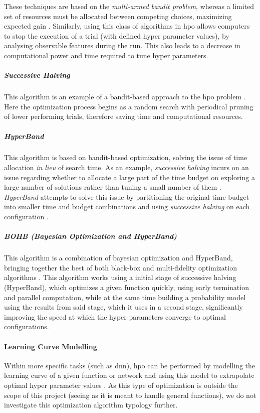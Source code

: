 These techniques are based on the \textit{multi-armed bandit problem}, whereas a limited set of resources must be allocated between competing choices, maximizing expected gain \parencite{Katehakis1987TheMB}. Similarly, using this class of algorithms in \acrshort{hpo} allows computers to stop the execution of a trial (with defined hyper parameter values), by analysing observable features during the run. This also leads to a decrease in computational power and time required to tune hyper parameters. 

\subparagraph{Successive Halving} 
This algorithm is an example of a bandit-based approach to the \acrshort{hpo} problem \parencite{jamieson2015nonstochastic}. Here the optimization process begins as a random search with periodical pruning of lower performing trials, therefore saving time and computational resources. 

\subparagraph{HyperBand}
This algorithm is based on bandit-based optimization, solving the issue of time allocation \textit{in lieu} of search time. As an example, \textit{successive halving} incurs on an issue regarding whether to allocate a large part of the time budget on exploring a large number of solutions rather than tuning a small number of them \parencite{elshawi2019automated}. \textit{HyperBand} attempts to solve this issue by partitioning the original time budget into smaller time and budget combinations and using \textit{successive halving} on each configuration \parencite{li2016hyperband}.

\subparagraph{BOHB (Bayesian Optimization and HyperBand)}
This algorithm is a combination of bayesian optimization and HyperBand, bringing together the best of both black-box and multi-fidelity optimization algorithms \parencite{pmlr-v80-falkner18a}. This algorithm works using a initial stage of successive halving (HyperBand), which optimizes a given function quickly, using early termination and parallel computation, while at the same time building a probability model using the results from said stage, which it uses in a second stage, significantly improving the speed at which the hyper parameters converge to optimal configurations.

\paragraph{Learning Curve Modelling}
Within more specific tasks (such as \acrfull{dnn}), \acrshort{hpo} can be performed by modelling the learning curve of a given function or network and using this model to extrapolate optimal hyper parameter values \parencite{10.5555/2832581.2832731}. As this type of optimization is outside the scope of this project (seeing as it is meant to handle general functions), we do not investigate this optimization algorithm typology further.